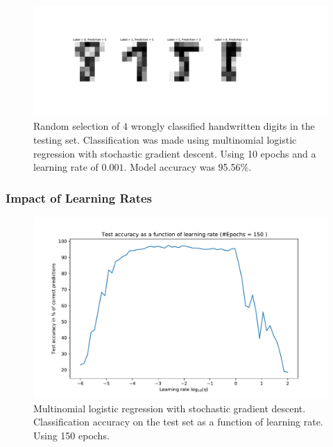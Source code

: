 \documentclass[11pt,a4paper,titlepage]{article}
\begin{document}
\begin{figure}[H]
\centering

\includegraphics[trim=6cm 5.0cm 12cm 5.0cm, clip=true,scale = 0.5]{Wrong_predictions_LogReg.pdf}
\caption[Wrongly classified Digits]{Random selection of 4 wrongly classified handwritten digits in the testing set. Classification was made using multinomial logistic regression with stochastic gradient descent. Using 10 epochs and a learning rate of $0.001$. Model accuracy was 95.56\%.}\label{Digits}
\end{figure}

\subsubsection{Impact of Learning Rates}


\begin{figure}[H]
\centering

\includegraphics[trim=1cm 0.4cm 1cm 0.8cm, clip=true,scale = 0.6]{e_test_accuracy_over_learning_rate.pdf}
\caption[Optimal regularization parameter to noise]{Multinomial logistic regression with stochastic gradient descent. Classification accuracy on the test set as a function of learning rate. Using 150 epochs.}\label{Acc_to_LR}
\end{figure}
\end{document}
